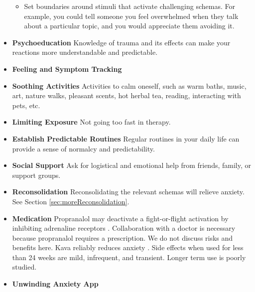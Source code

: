 \documentclass[12pt,letterpaper]{article}
\begin{document}
\begin{itemize}
\begin{itemize}
        \item Set boundaries around stimuli that activate challenging schemas. For example, you could tell someone you feel overwhelmed when they talk about a particular topic, and you would appreciate them avoiding it.
    \end{itemize}
    \item \textbf{Psychoeducation} Knowledge of trauma and its effects can make your reactions more understandable and predictable. 
    \item \textbf{Feeling and Symptom Tracking} 
    \item \textbf{Soothing Activities} Activities to calm oneself, such as warm baths, music, art, nature walks, pleasant scents, hot herbal tea, reading, interacting with pets, etc. 
    \item \textbf{Limiting Exposure} Not going too fast in therapy.  
    \item \textbf{Establish Predictable Routines} Regular routines in your daily life can provide a sense of normalcy and predictability. 
    \item \textbf{Social Support} Ask for logistical and emotional help from friends, family, or support groups. 
    \item \textbf{Reconsolidation} Reconsolidating the relevant schemas will relieve anxiety. See Section \ref{sec:moreReconsolidation}.
    \item \textbf{Medication} Propranalol may deactivate a fight-or-flight activation by inhibiting adrenaline receptors \cite{steenenPropranalol}. Collaboration with a doctor is necessary because propranalol requires a prescription. We do not discuss risks and benefits here. Kava reliably reduces anxiety \cite{Pittler03kava}. Side effects when used for less than 24 weeks are mild, infrequent, and transient. Longer term use is poorly studied.
    \item \textbf{Unwinding Anxiety App} \todo{}
\end{itemize}
\end{document}
